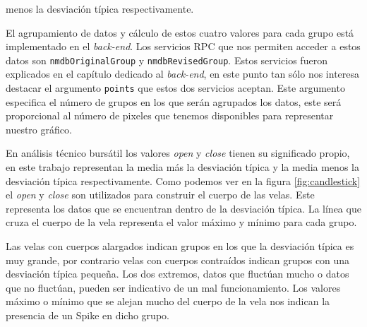 		menos la desviación típica respectivamente.
		\par
		El agrupamiento de datos y cálculo de estos cuatro valores para cada grupo está implementado en el \emph{back-end}. Los servicios RPC
		que nos permiten acceder a estos datos son \texttt{nmdbOriginalGroup} y \texttt{nmdbRevisedGroup}. Estos servicios fueron explicados
		en el capítulo dedicado al \emph{back-end}, en este punto tan sólo nos interesa destacar el argumento \texttt{points} que estos dos
		servicios aceptan. Este argumento especifica el número de grupos en los que serán agrupados los datos, este será proporcional al
		número de pixeles que tenemos disponibles para representar nuestro gráfico. 
		\par
		En análisis técnico bursátil los valores \emph{open} y \emph{close} tienen su significado propio, en este trabajo representan la media
		más la desviación típica y la media menos la desviación típica respectivamente. Como podemos ver en la figura \ref{fig:candlestick} el
		\emph{open} y \emph{close} son utilizados para construir el cuerpo de las velas. Este representa los datos que se encuentran dentro de
		la desviación típica. La línea que cruza el cuerpo de la vela representa el valor máximo y mínimo para cada grupo.
		\par
		Las velas con cuerpos alargados indican grupos en los que la desviación típica es muy grande, por contrario velas con cuerpos
		contraídos indican grupos con una desviación típica pequeña. Los dos extremos, datos que fluctúan mucho o datos que no fluctúan,
		pueden ser indicativo de un mal funcionamiento. Los valores máximo o mínimo que se alejan mucho del cuerpo de la vela nos indican la
		presencia de un Spike en dicho grupo. 	
